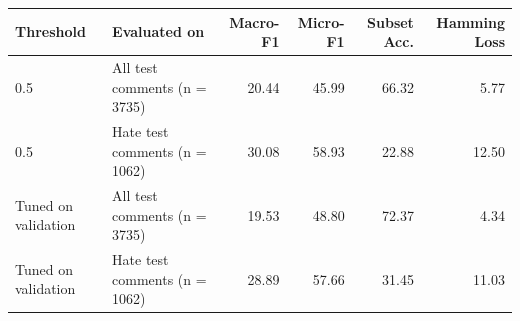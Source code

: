 \begin{tabular}{llrrrr}
\toprule
Threshold & Evaluated on & Macro-F1 & Micro-F1 & Subset Acc. & Hamming Loss \\
\midrule
0.5 & All test comments (n = 3735) & 20.44 & 45.99 & 66.32 & 5.77 \\
0.5 & Hate test comments (n = 1062) & 30.08 & 58.93 & 22.88 & 12.50 \\
Tuned on validation & All test comments (n = 3735) & 19.53 & 48.80 & 72.37 & 4.34 \\
Tuned on validation & Hate test comments (n = 1062) & 28.89 & 57.66 & 31.45 & 11.03 \\
\bottomrule
\end{tabular}
